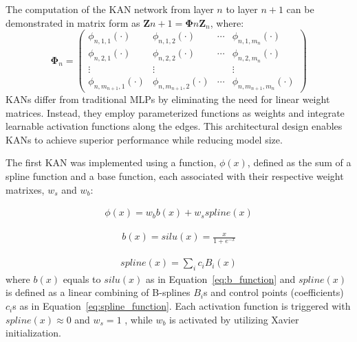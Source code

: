 \documentclass[times,twocolumn,final]{elsarticle}
\begin{document}
The computation of the KAN network from layer $n$ to layer $n+1$ can be demonstrated in matrix form as $\mathbf{Z}{n+1} = \boldsymbol{\Phi}{n}\mathbf{Z}_{n}$, where:
\begin{equation}
\boldsymbol{\Phi}_{n} = \left(\begin{array}{cccc}
\phi_{n, 1,1}(\cdot) & \phi_{n, 1,2}(\cdot) & \cdots & \phi_{n, 1, m_{n}}(\cdot) \\
\phi_{n, 2,1}(\cdot) & \phi_{n, 2,2}(\cdot) & \cdots & \phi_{n, 2, m_{n}}(\cdot) \\
\vdots & \vdots & & \vdots \\
\phi_{n, m_{n+1}, 1}(\cdot) & \phi_{n, m_{n+1}, 2}(\cdot) & \cdots & \phi_{n, m_{n+1}, m_{n}}(\cdot)
\end{array}\right)
\end{equation}
KANs differ from traditional MLPs by eliminating the need for linear weight matrices. Instead, they employ parameterized functions as weights and integrate learnable activation functions along the edges. This architectural design enables KANs to achieve superior performance while reducing model size.

The first KAN was implemented using a function, $\phi(x)$, defined as the sum of a spline function and a base function, each associated with their respective weight matrixes, $w_s$ and $w_b$:

\begin{equation}
\begin{aligned}
\phi(x) = w_b b(x) + w_s spline(x)
\end{aligned}
\label{eq:acti_funct_imp}
\end{equation}

\begin{equation}
\begin{aligned}
b(x) = silu(x) = \frac{x}{1 + e^{-x}}
\end{aligned}
\label{eq:b_function}
\end{equation}

\begin{equation}
\begin{aligned}
spline(x) = \sum_{i}c_iB_i(x)
\end{aligned}
\label{eq:spline_function}
\end{equation}
where \(b(x)\) equals to $silu(x)$ as in Equation~\ref{eq:b_function} and \(spline(x)\) is defined as a linear combining of B-splines $B_i$s and control points (coefficients) $c_i$s as in Equation~\ref{eq:spline_function}. Each activation function is triggered with \(spline(x) \approx 0\) and \(w_s = 1\) , while \(w_b\) is activated by utilizing Xavier initialization.
\end{document}
